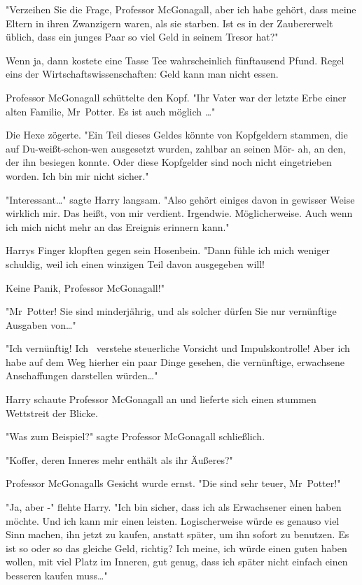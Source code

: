{"Verzeihen Sie die Frage, Professor McGonagall, aber ich habe gehört, dass meine Eltern in ihren Zwanzigern waren, als sie starben. Ist es in der Zaubererwelt üblich, dass ein junges Paar so viel Geld in seinem Tresor hat?"

Wenn ja, dann kostete eine Tasse Tee wahrscheinlich fünftausend Pfund. Regel eins der Wirtschaftswissenschaften: Geld kann man nicht essen.

Professor McGonagall schüttelte den Kopf. "Ihr Vater war der letzte Erbe einer alten Familie, Mr~Potter. Es ist auch möglich …"

Die Hexe zögerte. "Ein Teil dieses Geldes könnte von Kopfgeldern stammen, die auf Du-weißt-schon-wen ausgesetzt wurden, zahlbar an seinen Mör- ah, an den, der ihn besiegen konnte. Oder diese Kopfgelder sind noch nicht eingetrieben worden. Ich bin mir nicht sicher."

"Interessant…" sagte Harry langsam. "Also gehört einiges davon in gewisser Weise wirklich mir. Das heißt, von mir verdient. Irgendwie. Möglicherweise. Auch wenn ich mich nicht mehr an das Ereignis erinnern kann."

Harrys Finger klopften gegen sein Hosenbein. "Dann fühle ich mich weniger schuldig, weil ich einen winzigen Teil davon ausgegeben will!

Keine Panik, Professor McGonagall!"

"Mr~Potter! Sie sind minderjährig, und als solcher dürfen Sie nur vernünftige Ausgaben von…"

"Ich vernünftig! Ich ~verstehe steuerliche Vorsicht und Impulskontrolle! Aber ich habe auf dem Weg hierher ein paar Dinge gesehen, die vernünftige, erwachsene Anschaffungen darstellen würden…"

Harry schaute Professor McGonagall an und lieferte sich einen stummen Wettstreit der Blicke.

"Was zum Beispiel?" sagte Professor McGonagall schließlich.

"Koffer, deren Inneres mehr enthält als ihr Äußeres?"

Professor McGonagalls Gesicht wurde ernst. "Die sind sehr teuer, Mr~Potter!"

"Ja, aber -" flehte Harry. "Ich bin sicher, dass ich als Erwachsener einen haben möchte. Und ich kann mir einen leisten. Logischerweise würde es genauso viel Sinn machen, ihn jetzt zu kaufen, anstatt später, um ihn sofort zu benutzen. Es ist so oder so das gleiche Geld, richtig? Ich meine, ich würde einen guten haben wollen, mit viel Platz im Inneren, gut genug, dass ich später nicht einfach einen besseren kaufen muss…"

}
